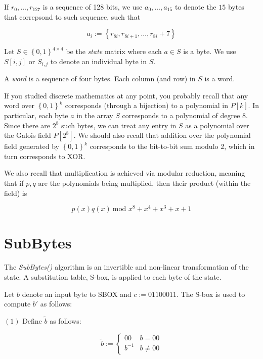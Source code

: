 \documentclass[a4paper, 12pt]{article}
\begin{document}
    
If $r_0, \ldots, r_{127}$ is a sequence of 128 bits, we use $a_0, \ldots, a_{15}$ to denote 
the $15$ bytes that correpsond to such sequence, such that 

\begin{equation*}
    a_i := \left\{r_{8i}, r_{8i + 1}, \ldots, r_{8i} + 7 \right\} 
\end{equation*}

Let $S \in \left\{ 0,1 \right\}^{4\times 4} $ be the \textit{state} matrix where 
each $a \in S$ is a byte. We use 
$S[i, j]$ or $S_{i,j}$ to denote an individual byte in $S$.

A \textit{word} is a sequence of four bytes. Each column (and row) in 
$S$ is a word.

If you studied discrete mathematics at any point, you probably recall that any
word over $\left\{ 0,1 \right\}^{k} $ corresponds (through a bijection) to a
polynomial in $P[k]$. In particular, each byte $a$ in the array $S$ corresponds
to a polynomial of degree $8$. Since there are $2^8$ such bytes, we can treat
any entry in $S$ as a polynomial over the Galois field $P[2^8]$. We should also
recall that addition over the polynomial field generated by $\left\{ 0,1
\right\}^k $ corresponds to the bit-to-bit sum modulo 2, which in turn
corresponds to XOR.

We also recall that multiplication is achieved via modular reduction, meaning 
that if $p, q$ are the polynomials being multiplied, then their product (within the field)
is 


\begin{equation*}
    p(x)q(x) ~ \text{mod } x^8 + x^4 + x^3 +x + 1
\end{equation*}

\section{SubBytes}

The \textit{SubBytes()} algorithm is an invertible and non-linear transformation of the state.
A substitution table, S-box, is applied to each byte of the state. 

Let $b$ denote an input byte to SBOX and $c := 01100011$. The S-box is used to compute 
$b'$ as follows: 

$(1)$ Define $\widetilde{ b } $ as follows: 

\begin{equation*}
    \widetilde{ b }  := \begin{cases}
        00 & b = 00 \\ 
        b^{-1} & b \neq 00
    \end{cases}
\end{equation*}
\end{document}
